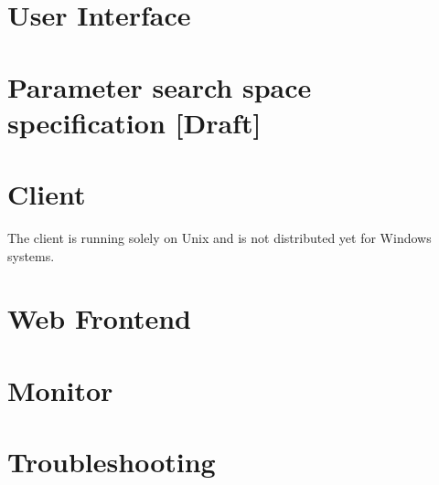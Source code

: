 \documentclass[twoside,a4paper]{refart}
\theoremstyle{dotless}
\newcounter{ex}
\begin{document}
\section{User Interface}



\newpage
\section{Parameter search space specification [Draft]}
\label{parameter_spec}

\clearpage



\newpage
\section{Client}
\label{client}

\clearpage

\attention The client is running solely on Unix and is not distributed yet for Windows systems.

\newpage
\section{Web Frontend}
\label{web_frontend}

\clearpage

\section{Monitor}

\section{Troubleshooting}



\begin{fullpage}
\printglossary
\end{fullpage}

\printindex
\end{document}
